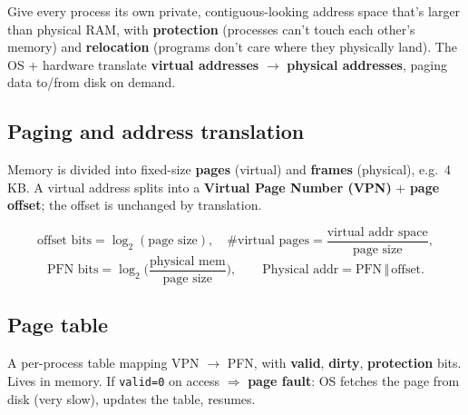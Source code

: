 \documentclass[10pt]{article}
\newcommand{\code}[1]{\texttt{\small #1}}
\begin{document}
\begin{keybox}
Give every process its own private, contiguous-looking address space that's larger than physical
RAM, with \textbf{protection} (processes can't touch each other's memory) and
\textbf{relocation} (programs don't care where they physically land). The OS + hardware translate
\textbf{virtual addresses} $\to$ \textbf{physical addresses}, paging data to/from disk on demand.
\end{keybox}

\subsection{Paging and address translation}
Memory is divided into fixed-size \textbf{pages} (virtual) and \textbf{frames} (physical), e.g.\
4\,KB. A virtual address splits into a \textbf{Virtual Page Number (VPN)} + \textbf{page offset};
the offset is unchanged by translation.

\begin{center}
\end{center}

\begin{formbox}
\[
\text{offset bits} = \log_2(\text{page size}),\quad
\#\text{virtual pages} = \frac{\text{virtual addr space}}{\text{page size}},
\]
\[
\text{PFN bits} = \log_2\!\Big(\frac{\text{physical mem}}{\text{page size}}\Big),\qquad
\text{Physical addr} = \text{PFN}\,\Vert\,\text{offset}.
\]
\end{formbox}

\subsection{Page table}
A per-process table mapping VPN $\to$ PFN, with \textbf{valid}, \textbf{dirty}, \textbf{protection}
bits. Lives in memory. If \code{valid=0} on access $\Rightarrow$ \textbf{page fault}: OS fetches
the page from disk (very slow), updates the table, resumes.
\end{document}
